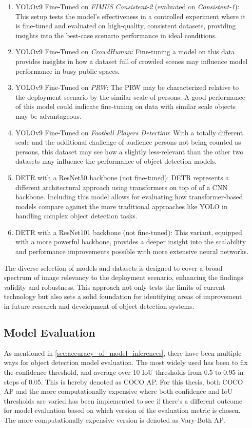 \begin{enumerate}
    \newpage
    \item YOLOv9 Fine-Tuned on \textit{FIMUS Consistent-2} (evaluated on \textit{Consistent-1}): This setup tests the model's effectiveness in a controlled experiment where it is fine-tuned and evaluated on high-quality, consistent datasets, providing insights into the best-case scenario performance in ideal conditions.
    \item YOLOv9 Fine-Tuned on \textit{CrowdHuman}: Fine-tuning a model on this data provides insights in how a dataset full of crowded scenes may influence model performance in busy public spaces.
    \item YOLOv9 Fine-Tuned on \textit{PRW}: The PRW may be characterized relative to the deployment scenario by the similar scale of persons. A good performance of this model could indicate fine-tuning on data with similar scale objects may be advantageous.
    \item YOLOv9 Fine-Tuned on \textit{Football Players Detection}: With a totally different scale and the additional challenge of audience persons not being counted as persons, this dataset may see how a slightly less-relevant than the other two datasets may influence the performance of object detection models.
    \item DETR with a ResNet50 backbone (not fine-tuned): DETR represents a different architectural approach using transformers on top of of a CNN backbone. Including this model allows for evaluating how transformer-based models compare against the more traditional approaches like YOLO in handling complex object detection tasks.
    \item DETR with a ResNet101 backbone (not fine-tuned): This variant, equipped with a more powerful backbone, provides a deeper insight into the scalability and performance improvements possible with more extensive neural networks.
\end{enumerate}

The diverse selection of models and datasets is designed to cover a broad spectrum of image relevancy to the deployment scenario, enhancing the findings validity and robustness. This approach not only tests the limits of current technology but also sets a solid foundation for identifying areas of improvement in future research and development of object detection systems.

\subsection{Model Evaluation}
\label{sec:methodology_model_evaluation}
As mentioned in \ref{sec:accuracy_of_model_inferences}, there have been multiple ways for object detection model evaluation. The most widely used has been to fix the confidence threshold, and average over 10 IoU thresholds from 0.5 to 0.95 in steps of 0.05. This is hereby denoted as COCO AP. For this thesis, both COCO AP and the more computationally expensive where both confidence and IoU thresholds are varied has been implemented to see if there's a different outcome for model evaluation based on which version of the evaluation metric is chosen. The more computationally expensive version is denoted as Vary-Both AP.

